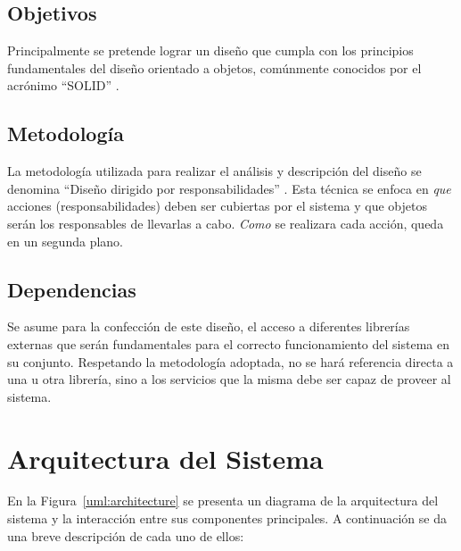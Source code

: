 \documentclass[a4paper,10pt]{article}
\begin{document}
  \subsection{Objetivos}
  Principalmente se pretende lograr un dise\~no que cumpla con los principios
fundamentales del dise\~no orientado a objetos, com\'unmente conocidos por el
acr\'onimo ``SOLID'' \cite{martin00}.
  
  \subsection{Metodolog\'ia}
  La metodolog\'ia utilizada para realizar el an\'alisis y descripci\'on del
dise\~no se denomina ``Dise\~no dirigido por responsabilidades''
\cite{wirfsbrok03}. Esta t\'ecnica se enfoca en \textit{que} acciones
(responsabilidades) deben ser cubiertas por el sistema y que objetos ser\'an los
responsables de llevarlas a cabo. \textit{Como} se realizara cada acci\'on,
queda en un segunda plano.

  \subsection{Dependencias}
  Se asume para la confecci\'on de este dise\~no, el acceso a diferentes
librer\'ias externas que ser\'an fundamentales para el correcto funcionamiento
del
sistema en su conjunto.
  Respetando la metodolog\'ia adoptada, no se har\'a referencia directa a una u
otra librer\'ia, sino a los servicios que la misma debe ser capaz de proveer al
sistema.

\section{Arquitectura del Sistema}
  \label{architecture}
  En la Figura~\ref{uml:architecture} se presenta un diagrama de la
arquitectura del sistema y la interacci\'on entre sus componentes principales.
A continuaci\'on se da una breve descripci\'on de cada uno de ellos:
\end{document}
